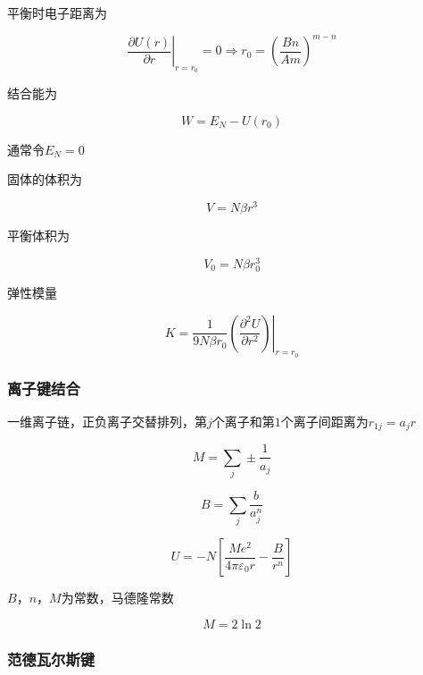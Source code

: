 \documentclass{article}
\begin{document}
\begin{multicols}{2}
平衡时电子距离为

\begin{equation*}
  \left. \frac{\partial U \left( r \right) }{\partial r} \right|_{r=r_0} = 0
  \Rightarrow
  r_0 = \left( \frac{Bn}{Am} \right)^{m-n}
\end{equation*}

结合能为

\begin{equation*}
  W = E_N - U \left( r_0 \right)
\end{equation*}

通常令$E_N=0$

固体的体积为

\begin{equation*}
  V = N \beta r^3
\end{equation*}

平衡体积为

\begin{equation*}
  V_0 = N \beta r_0^3
\end{equation*}

弹性模量

\begin{equation*}
  K = \left. \frac{1}{9N\beta r_{0}} \left( \frac{\partial^{2} U}{\partial r^2} \right)\right|_{r=r_0}
\end{equation*}

\subsubsection{离子键结合}

一维离子链，正负离子交替排列，第$j$个离子和第$1$个离子间距离为$r_{1j}=a_jr$

\begin{equation*}
  M = \sum_j \pm \frac{1}{a_j}
\end{equation*}

\begin{equation*}
  B = \sum_j \frac{b}{a_j^n}
\end{equation*}

\begin{equation*}
  U = - N \left[ \frac{Me^{2}}{4\pi \varepsilon_{0} r} - \frac{B}{r^{n}} \right]
\end{equation*}

$B$，$n$，$M$为常数，马德隆常数

\begin{equation*}
  M = 2 \ln 2
\end{equation*}

\subsubsection{范德瓦尔斯键}


\end{multicols}
\end{document}
